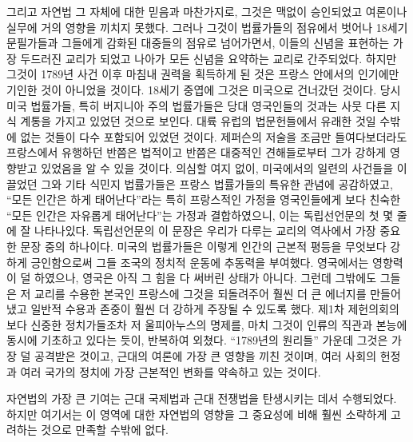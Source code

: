 그리고 자연법 그 자체에 대한 믿음과 마찬가지로,
그것은 맥없이 승인되었고 여론이나 실무에 거의 영향을 끼치지 못했다.
그러나 그것이
법률가들의 점유에서 벗어나 18세기 문필가들과
그들에게 감화된 대중들의 점유로 넘어가면서,
이들의 신념을 표현하는 가장 두드러진 교리가 되었고
나아가 모든 신념을 요약하는 교리로 간주되었다.
하지만 그것이 1789년 사건 이후 마침내 권력을 획득하게 된 것은
프랑스 안에서의 인기에만 기인한 것이 아니었을 것이다.
18세기 중엽에 그것은 미국으로 건너갔던 것이다.
당시 미국 법률가들, 특히 버지니아 주의 법률가들은
당대 영국인들의 것과는 사뭇 다른 지식 계통을 가지고 있었던 것으로 보인다.
대륙 유럽의 법문헌들에서 유래한 것일 수밖에 없는 것들이
다수 포함되어 있었던 것이다.
제퍼슨의 저술을 조금만 들여다보더라도
프랑스에서 유행하던 반쯤은 법적이고 반쯤은 대중적인 견해들로부터
그가 강하게 영향받고 있었음을 알 수 있을 것이다.
의심할 여지 없이, 미국에서의 일련의 사건들을 이끌었던
그와 기타 식민지 법률가들은
프랑스 법률가들의 특유한 관념에 공감하였고,
``모든 인간은 하게 태어난다''라는 특히 프랑스적인 가정을
영국인들에게 보다 친숙한 ``모든 인간은 자유롭게 태어난다''는 가정과
결합하였으니,
이는 독립선언문의 첫 몇 줄에 잘 나타나있다.
독립선언문의 이 문장은 우리가 다루는 교리의 역사에서
가장 중요한 문장 중의 하나이다.
미국의 법률가들은 이렇게 인간의 근본적 평등을 무엇보다 강하게 긍인함으로써
그들 조국의 정치적 운동에 추동력을 부여했다.
영국에서는 영향력이 덜 하였으나, 영국은 아직
그 힘을 다 써버린 상태가 아니다.
그런데 그밖에도 그들은 저 교리를 수용한 본국인 프랑스에 그것을 되돌려주어
훨씬 더 큰 에너지를 만들어냈고 일반적 수용과 존중이 훨씬 더 강하게
주장될 수 있도록 했다.
제1차 제헌의회의 보다 신중한 정치가들조차
저 울피아누스의 명제를,
마치 그것이 인류의 직관과 본능에 동시에 기초하고 있다는 듯이,
반복하여 외쳤다.
``1789년의 원리들'' 가운데 그것은 가장 덜 공격받은 것이고,
근대의 여론에 가장 큰 영향을 끼친 것이며,
여러 사회의 헌정과 여러 국가의 정치에 가장 근본적인 변화를
약속하고 있는 것이다.

자연법의 가장 큰 기여는 근대 국제법과 근대 전쟁법을 탄생시키는 데서 수행되었다.
하지만 여기서는 이 영역에 대한 자연법의 영향을
그 중요성에 비해 훨씬 소략하게 고려하는 것으로 만족할 수밖에 없다.

